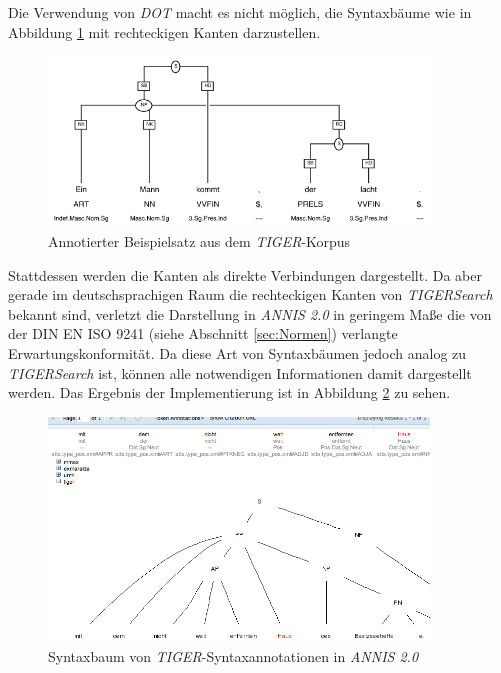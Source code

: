 Die Verwendung von \emph{DOT} macht es nicht möglich, die Syntaxbäume wie in Abbildung \ref{fig:tiger-example2} mit rechteckigen Kanten darzustellen. 

\begin{figure}[H]
	\centering
	\includegraphics*[width=0.9\textwidth]{figures/tiger-example1}
	\caption{Annotierter Beispielsatz aus dem \emph{TIGER}-Korpus}
	\label{fig:tiger-example2}
\end{figure}

Stattdessen werden die Kanten als direkte Verbindungen dargestellt. Da aber gerade im deutschsprachigen Raum die rechteckigen Kanten von \emph{TIGERSearch} bekannt sind, verletzt die Darstellung in \emph{ANNIS 2.0} in geringem Maße die von der DIN EN ISO 9241 (siehe Abschnitt \ref{sec:Normen}) verlangte Erwartungskonformität. Da diese Art von Syntaxbäumen jedoch analog zu \emph{TIGERSearch} ist, können alle notwendigen Informationen damit dargestellt werden. Das Ergebnis der Implementierung ist in Abbildung \ref{fig:SyntaxbaumScreenshot} zu sehen.

\begin{figure}[H]
	\centering
	\includegraphics*[width=0.9\textwidth]{figures/DA/ScreenshotSyntaxbaum.jpg}
	\caption{Syntaxbaum von \emph{TIGER}-Syntaxannotationen in \emph{ANNIS 2.0}}\label{fig:SyntaxbaumScreenshot}
\end{figure}

